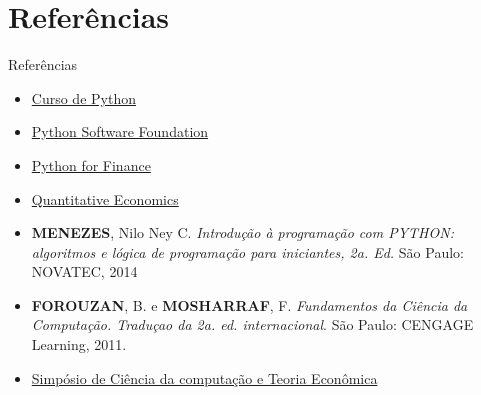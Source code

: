\documentclass{beamer}
\begin{document}
	\section{Referências}
	\begin{frame}{Referências}
		\begin{itemize}
			\item \href{http://www.cursou.com.br/informatica/curso-de-phyton/}{Curso de Python}
			\item \href{https://www.python.org/}{Python Software Foundation}
			\item \href{https://www.packtpub.com/application-development/python-finance}{Python for Finance}
			\item \href{http://quant-econ.net/}{Quantitative Economics}
			\item \textbf{MENEZES}, Nilo Ney C. \textit{Introdução à programação com PYTHON: algoritmos e lógica de programação para iniciantes, 2a. Ed.}  São Paulo: NOVATEC, 2014
			\item \textbf{FOROUZAN}, B. e \textbf{MOSHARRAF}, F. \textit{Fundamentos da Ciência da Computação. Traduçao da 2a. ed. internacional}. São Paulo: CENGAGE Learning, 2011.
			\item \href{http://www.sciencedirect.com/science/article/pii/S0022053114001616}{Simpósio de Ciência da computação e Teoria Econômica}
		\end{itemize}
	\end{frame}
	
	
	
	
	
\end{document}
